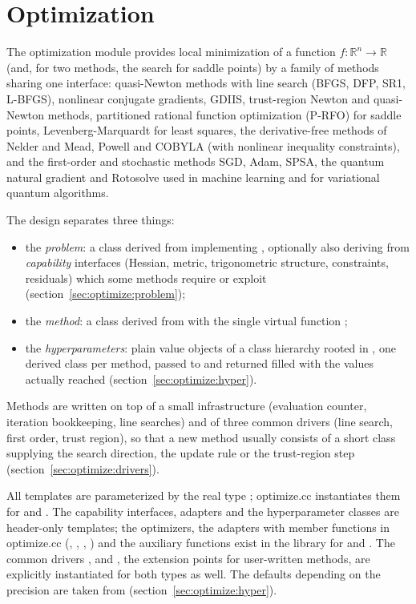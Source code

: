 \chapter{Optimization}\label{ch:optimize}


The optimization module provides local minimization of a function $f:\mathbb{R}^n\to\mathbb{R}$ (and, for two methods, the
search for saddle points) by a family of methods sharing one interface: quasi-Newton methods with line search (BFGS, DFP, SR1,
L-BFGS), nonlinear conjugate gradients, GDIIS, trust-region Newton and quasi-Newton methods, partitioned rational function
optimization (P-RFO) for saddle points, Levenberg-Marquardt for least squares, the derivative-free methods of Nelder and Mead,
Powell and COBYLA (with nonlinear inequality constraints), and the first-order and stochastic methods SGD, Adam, SPSA, the
quantum natural gradient and Rotosolve used in machine learning and for variational quantum algorithms.

The design separates three things:
\begin{itemize}
\item the \emph{problem}: a class derived from  implementing , optionally also
deriving from \emph{capability} interfaces (Hessian, metric, trigonometric structure, constraints, residuals) which some
methods require or exploit (section~\ref{sec:optimize:problem});
\item the \emph{method}: a class derived from  with the single virtual function ;
\item the \emph{hyperparameters}: plain value objects of a class hierarchy rooted in , one derived
class per method, passed to  and returned filled with the values actually reached
(section~\ref{sec:optimize:hyper}).
\end{itemize}
Methods are written on top of a small infrastructure (evaluation counter, iteration bookkeeping, line searches) and of three
common drivers (line search, first order, trust region), so that a new method usually consists of a short class supplying the
search direction, the update rule or the trust-region step (section~\ref{sec:optimize:drivers}).

All templates are parameterized by the real type ; optimize.cc instantiates them for  and
. The capability interfaces, adapters and the hyperparameter classes are header-only templates; the optimizers, the
adapters with member functions in optimize.cc (, , ,
) and the auxiliary functions exist in the library for  and .
The common drivers ,  and , the extension
points for user-written methods, are explicitly instantiated for both types as well. The defaults depending on the precision
are taken from  (section~\ref{sec:optimize:hyper}).

